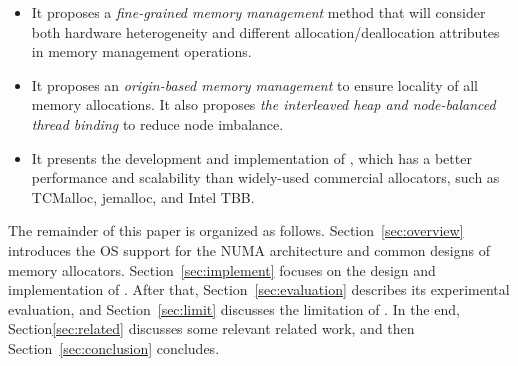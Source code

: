 \begin{itemize}

\item It proposes a \textit{fine-grained memory management} method that will consider both hardware heterogeneity and different allocation/deallocation attributes in memory management operations.

\item It proposes an \textit{origin-based memory management} to ensure locality of all memory allocations. It also proposes \textit{the interleaved heap and node-balanced thread binding} to reduce node imbalance.

\item It presents the development and implementation of \NM{}, which has a better performance and scalability than widely-used commercial allocators, such as TCMalloc, jemalloc, and Intel TBB. 

\end{itemize}

The remainder of this paper is organized as follows. Section~\ref{sec:overview} introduces the OS support for the NUMA architecture and common designs of memory allocators. Section~\ref{sec:implement} focuses on the design and implementation of \NM{}. After that, Section~\ref{sec:evaluation} describes its experimental evaluation, and Section~\ref{sec:limit} discusses the limitation of \NM{}. In the end, Section\ref{sec:related} discusses some relevant related work, and then Section~\ref{sec:conclusion} concludes. 

